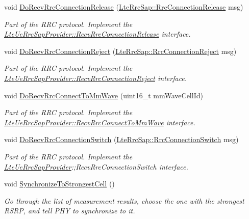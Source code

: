 \begin{DoxyCompactItemize}
void \hyperlink{classns3_1_1LteUeRrc_abcf0c887261105ca1e7d6417af97d0ee}{Do\+Recv\+Rrc\+Connection\+Release} (\hyperlink{structns3_1_1LteRrcSap_1_1RrcConnectionRelease}{Lte\+Rrc\+Sap\+::\+Rrc\+Connection\+Release} msg)
\begin{DoxyCompactList}\small\item\em Part of the R\+RC protocol. Implement the \hyperlink{classns3_1_1LteUeRrcSapProvider_a680b8881dd2f817c3745c41965d413e1}{Lte\+Ue\+Rrc\+Sap\+Provider\+::\+Recv\+Rrc\+Connection\+Release} interface. \end{DoxyCompactList}\item 
void \hyperlink{classns3_1_1LteUeRrc_a0c0418eb3414c454002a7bbb2362cbf5}{Do\+Recv\+Rrc\+Connection\+Reject} (\hyperlink{structns3_1_1LteRrcSap_1_1RrcConnectionReject}{Lte\+Rrc\+Sap\+::\+Rrc\+Connection\+Reject} msg)
\begin{DoxyCompactList}\small\item\em Part of the R\+RC protocol. Implement the \hyperlink{classns3_1_1LteUeRrcSapProvider_a20b96bb1978b23963670d0d3b62bcb35}{Lte\+Ue\+Rrc\+Sap\+Provider\+::\+Recv\+Rrc\+Connection\+Reject} interface. \end{DoxyCompactList}\item 
void \hyperlink{classns3_1_1LteUeRrc_a5934aa472415b5e9199d8316269c67c6}{Do\+Recv\+Rrc\+Connect\+To\+Mm\+Wave} (uint16\+\_\+t mm\+Wave\+Cell\+Id)
\begin{DoxyCompactList}\small\item\em Part of the R\+RC protocol. Implement the \hyperlink{classns3_1_1LteUeRrcSapProvider_a506fe4c7cf1c33772069c7dc2d02f3b9}{Lte\+Ue\+Rrc\+Sap\+Provider\+::\+Recv\+Rrc\+Connect\+To\+Mm\+Wave} interface. \end{DoxyCompactList}\item 
void \hyperlink{classns3_1_1LteUeRrc_a7d1bed1ac9bb691c81591d16d21206a0}{Do\+Recv\+Rrc\+Connection\+Switch} (\hyperlink{structns3_1_1LteRrcSap_1_1RrcConnectionSwitch}{Lte\+Rrc\+Sap\+::\+Rrc\+Connection\+Switch} msg)
\begin{DoxyCompactList}\small\item\em Part of the R\+RC protocol. Implement the \hyperlink{classns3_1_1LteUeRrcSapProvider}{Lte\+Ue\+Rrc\+Sap\+Provider}\+:;Recv\+Rrc\+Connection\+Switch interface. \end{DoxyCompactList}\item 
void \hyperlink{classns3_1_1LteUeRrc_a4ae3c615baa5a37f7f8b24c44c5b19e3}{Synchronize\+To\+Strongest\+Cell} ()
\begin{DoxyCompactList}\small\item\em Go through the list of measurement results, choose the one with the strongest R\+S\+RP, and tell P\+HY to synchronize to it. \end{DoxyCompactList}\item 

\end{DoxyCompactItemize}
